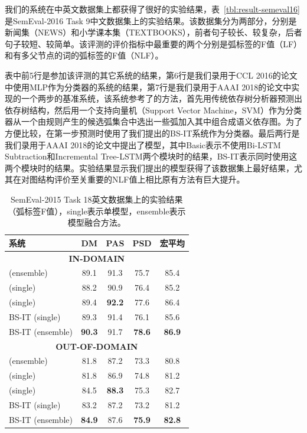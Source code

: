 我们的系统在中英文数据集上都获得了很好的实验结果，表~\ref{tbl:result-semeval16}是SemEval-2016 Task 9中文数据集上的实验结果。该数据集分为两部分，分别是新闻集（NEWS）和小学课本集（TEXTBOOKS），前者句子较长、较复杂，后者句子较短、较简单。该评测的评价指标中最重要的两个分别是弧标签的F值（LF）和有多父节点的词的弧标签的F值（NLF）。

表中前5行是参加该评测的其它系统的结果，第6行是我们录用于CCL 2016的论文中使用MLP作为分类器的系统的结果，第7行是我们录用于AAAI 2018的论文中实现的一个两步的基准系统，该系统参考了的方法，首先用传统依存树分析器预测出依存树结构，然后用一个支持向量机（Support Vector Machine，SVM）作为分类器从一个由规则产生的候选弧集合中选出一些弧加入其中组合成语义依存图。为了方便比较，在第一步预测时使用了我们提出的BS-IT系统作为分类器。最后两行是我们录用于AAAI 2018的论文中提出了模型，其中Basic表示不使用Bi-LSTM Subtraction和Incremental Tree-LSTM两个模块时的结果，BS-IT表示同时使用这两个模块时的结果。实验结果显示我们提出的模型获得了该数据集上最好结果，尤其在对图结构评价至关重要的NLF值上相比原有方法有巨大提升。

\begin{table}
	\centering
	\begin{tabular}{l||ccc|c}
		\hline
		\bf 系统&\bf DM&\bf PAS&\bf PSD &\bf 宏平均\\
		\hline
		\multicolumn{5}{c}{\bf IN-DOMAIN}\\
		\hline
		\citeayu{du-EtAl:2015:SemEval} (ensemble) &89.1&91.3&75.7&85.4\\
		\citeayu{almeida-martins:2015:SemEval} (single) &88.2&90.9&76.4&85.2\\
		\citeayu{peng-thomson-smith:2017:Long} (single) &89.4&\bf 92.2&77.6&86.4\\
		\hline
		BS-IT (single) &89.3&91.4&76.1&85.6\\
		BS-IT (ensemble) &\bf 90.3& 91.7&\bf 78.6&\bf 86.9\\
		\hline
		\multicolumn{5}{c}{\bf OUT-OF-DOMAIN}\\
		\hline
		\citeayu{du-EtAl:2015:SemEval} (ensemble) &81.8&87.2&73.3&80.8\\
		\citeayu{almeida-martins:2015:SemEval} (single) &81.8&86.9&74.8&81.2\\
		\citeayu{peng-thomson-smith:2017:Long} (single) &84.5&\bf 88.3&75.3&82.7\\
		\hline
		BS-IT  (single) &83.2&87.2&73.2&81.2\\
		BS-IT (ensemble) &\bf 84.9&87.6&\bf 75.9&\bf 82.8\\
		\hline
	\end{tabular}
	\caption{SemEval-2015 Task 18英文数据集上的实验结果（弧标签F值），single表示单模型，ensemble表示模型融合方法。}
	\label{tbl:result-semeval15}
\end{table}

